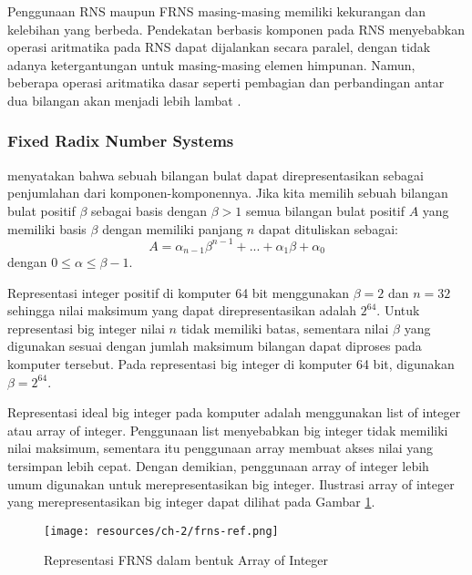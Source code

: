     Penggunaan RNS maupun FRNS masing-masing memiliki kekurangan dan kelebihan yang berbeda. Pendekatan berbasis komponen pada RNS menyebabkan operasi aritmatika pada RNS dapat dijalankan secara paralel, dengan tidak adanya ketergantungan untuk masing-masing elemen himpunan. Namun, beberapa operasi aritmatika dasar seperti pembagian dan perbandingan antar dua bilangan akan menjadi lebih lambat \citep{gpu_bignum}.

    \subsubsection{Fixed Radix Number Systems} \label{sec:frns}

    \citet{modern_comp_math} menyatakan bahwa sebuah bilangan bulat dapat direpresentasikan sebagai penjumlahan dari komponen-komponennya. Jika kita memilih sebuah bilangan bulat positif $\beta$ sebagai basis dengan $\beta > 1 $ semua bilangan bulat positif $A$ yang memiliki basis $\beta$ dengan memiliki panjang $n$ dapat dituliskan sebagai:
    \begin{equation} \label{eq:frns_rep}
      A = \alpha_{n-1}\beta^{n-1}+...+\alpha_{1}\beta+\alpha_{0}
    \end{equation}
    dengan $0 \leq \alpha \leq \beta -1$.

    Representasi integer positif di komputer 64 bit menggunakan $\beta = 2$ dan $n = 32$ sehingga nilai maksimum yang dapat direpresentasikan adalah $2^{64}$. Untuk representasi big integer nilai $n$ tidak memiliki batas, sementara nilai $\beta$ yang digunakan sesuai dengan jumlah maksimum bilangan dapat diproses pada komputer tersebut. Pada representasi big integer di komputer 64 bit, digunakan $\beta = 2^{64}$.

    Representasi ideal big integer pada komputer adalah menggunakan list of integer atau array of integer. Penggunaan list menyebabkan big integer tidak memiliki nilai maksimum, sementara itu penggunaan array membuat akses nilai yang tersimpan lebih cepat. Dengan demikian, penggunaan array of integer lebih umum digunakan untuk merepresentasikan big integer. Ilustrasi array of integer yang merepresentasikan big integer dapat dilihat pada Gambar \ref{fig:frns_ref}.

    \begin{figure}[h]
      \centering
      \texttt{[image: resources/ch-2/frns-ref.png]}
      \caption{Representasi FRNS dalam bentuk Array of Integer}
      \label{fig:frns_ref}
    \end{figure}
    
